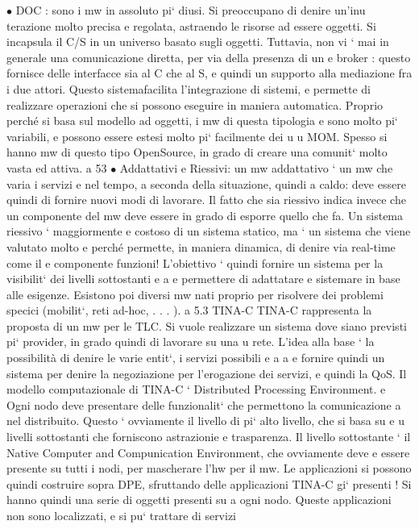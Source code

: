 \documentclass[a4paper,12pt]{article}
\begin{document}
$\bullet$ DOC : sono i mw in assoluto pi` diusi. Si preoccupano di denire un'inu
terazione molto precisa e regolata, astraendo le risorse ad essere oggetti.
Si incapsula il C/S in un universo basato sugli oggetti. Tuttavia, non vi
` mai in generale una comunicazione diretta, per via della presenza di un
e
broker : questo fornisce delle interfacce sia al C che al S, e quindi un supporto alla mediazione fra i due attori.
Questo sistemafacilita l'integrazione
di sistemi, e permette di realizzare operazioni che si possono eseguire in
maniera automatica.
Proprio perché si basa sul modello ad oggetti, i mw di questa tipologia
e
sono molto pi` variabili, e possono essere estesi molto pi` facilmente dei
u
u
MOM. Spesso si hanno mw di questo tipo OpenSource, in grado di creare
una comunit` molto vasta ed attiva.
a
53
$\bullet$ Addattativi e Riessivi: un mw addattativo ` un mw che varia i servizi
e
nel tempo, a seconda della situazione, quindi a caldo: deve essere quindi
di fornire nuovi modi di lavorare.
Il fatto che sia riessivo indica invece che un componente del mw deve essere in grado di esporre quello che fa. Un
sistema riessivo ` maggiormente
e
costoso di un sistema statico, ma ` un sistema che viene valutato molto
e
perché permette, in maniera dinamica, di denire via real-time come il
e
componente funzioni!
L'obiettivo ` quindi fornire un sistema per la visibilit` dei livelli sottostanti
e
a
e permettere di adattatare e sistemare in base alle esigenze.
Esistono poi diversi mw nati proprio per risolvere dei problemi specici (mobilit`, reti ad-hoc, . . . ).
a
5.3
TINA-C
TINA-C rappresenta la proposta di un mw per le TLC. Si vuole realizzare un
sistema dove siano previsti pi` provider, in grado quindi di lavorare su una
u
rete. L'idea alla base ` la possibilità di denire le varie entit`, i servizi possibili
e
a
a
e fornire quindi un sistema per denire la negoziazione per l'erogazione dei
servizi, e quindi la QoS.
Il modello computazionale di TINA-C ` Distributed Processing Environment.
e
Ogni nodo deve presentare delle funzionalit` che permettono la comunicazione
a
nel distribuito. Questo ` ovviamente il livello di pi` alto livello, che si basa su
e
u
livelli sottostanti che forniscono astrazionie e trasparenza. Il livello sottostante
` il Native Computer and Compunication Environment, che ovviamente deve
e
essere presente su tutti i nodi, per mascherare l'hw per il mw.
Le applicazioni si possono quindi costruire sopra DPE, sfruttando delle applicazioni TINA-C gi` presenti ! Si hanno
quindi una serie di oggetti presenti su
a
ogni nodo. Queste applicazioni non sono localizzati, e si pu` trattare di servizi
\end{document}
